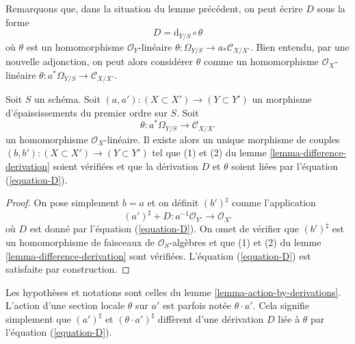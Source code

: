 \noindent
Remarquons que, dans la situation du lemme précédent, on peut écrire
$D$ sous la forme
\begin{equation}
\label{equation-D}
D = \text{d}_{Y/S} \circ \theta
\end{equation}
où $\theta$ est un homomorphisme $\mathcal{O}_Y$-linéaire
$\theta : \Omega_{Y/S} \to a_*\mathcal{C}_{X/X'}$.
Bien entendu, par une nouvelle adjonction, on peut alors considérer $\theta$ comme un
homomorphisme $\mathcal{O}_X$-linéaire
$\theta : a^*\Omega_{Y/S} \to \mathcal{C}_{X/X'}$.

\begin{lemma}
\label{lemma-action-by-derivations}
Soit $S$ un schéma.
Soit $(a, a') : (X \subset X') \to (Y \subset Y')$
un morphisme d'épaississements du premier ordre sur $S$.
Soit
$$
\theta : a^*\Omega_{Y/S} \to \mathcal{C}_{X/X'}
$$
un homomorphisme $\mathcal{O}_X$-linéaire. Il existe alors un unique morphisme de couples
$(b, b') : (X \subset X') \to (Y \subset Y')$ tel que
(1) et (2) du
lemme \ref{lemma-difference-derivation}
soient vérifiées et que la dérivation $D$ et $\theta$ soient liées par
l'équation (\ref{equation-D}).
\end{lemma}

\begin{proof}
On pose simplement $b = a$ et on définit $(b')^\sharp$ comme l'application
$$
(a')^\sharp + D : a^{-1}\mathcal{O}_{Y'} \to \mathcal{O}_{X'}
$$
où $D$ est donné par l'équation (\ref{equation-D}). On omet de vérifier
que $(b')^\sharp$ est un homomorphisme de faisceaux de $\mathcal{O}_S$-algèbres et
que (1) et (2) du
lemme \ref{lemma-difference-derivation}
sont vérifiées. L'équation (\ref{equation-D}) est satisfaite par construction.
\end{proof}

\begin{remark}
\label{remark-action-by-derivations}
Les hypothèses et notations sont celles du lemme \ref{lemma-action-by-derivations}.
L'action d'une section locale $\theta$ sur $a'$ est parfois notée
$\theta \cdot a'$. Cela signifie simplement
que $(a')^\sharp$ et $(\theta \cdot a')^\sharp$ diffèrent d'une dérivation
$D$ liée à $\theta$ par l'équation (\ref{equation-D}).
\end{remark}

